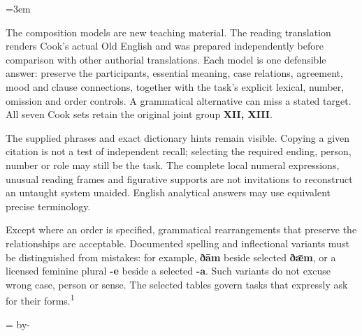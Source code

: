\newcommand{\runningtitle}{Unit 17. Answer key}

\emergencystretch=3em
\newcommand{\itempara}[2]{\par\addvspace{3pt}\noindent\hangindent=1.8em\hangafter=1\makebox[1.8em][l]{#1.}#2\par}
\newcommand{\reserve}[1]{\par\penalty-100\begingroup\dimen0=\pagegoal\advance\dimen0 by-\pagetotal\ifdim\dimen0<#1\newpage\fi\endgroup}

\raggedright
{}

The composition models are new teaching material. The reading translation renders Cook's actual Old English and was prepared independently before comparison with other authorial translations. Each model is one defensible answer: preserve the participants, essential meaning, case relations, agreement, mood and clause connections, together with the task's explicit lexical, number, omission and order controls. A grammatical alternative can miss a stated target. All seven Cook sets retain the original joint group \textbf{XII, XIII}.

The supplied phrases and exact dictionary hints remain visible. Copying a given citation is not a test of independent recall; selecting the required ending, person, number or role may still be the task. The complete local numeral expressions, unusual reading frames and figurative supports are not invitations to reconstruct an untaught system unaided. English analytical answers may use equivalent precise terminology.

Except where an order is specified, grammatical rearrangements that preserve the relationships are acceptable. Documented spelling and inflectional variants must be distinguished from mistakes: for example, \textbf{ðām} beside selected \textbf{ðǣm}, or a licensed feminine plural \textbf{-e} beside a selected \textbf{-a}. Such variants do not excuse wrong case, person or sense. The selected tables govern tasks that expressly ask for their forms.\textsuperscript{1}

\reserve{7\baselineskip}
